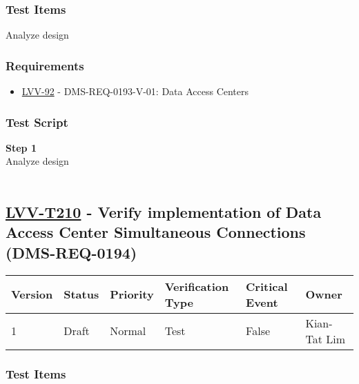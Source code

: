 \hypertarget{test-items-185}{%
\subsubsection{Test Items}\label{test-items-185}}

Analyze design

\hypertarget{requirements-186}{%
\subsubsection{Requirements}\label{requirements-186}}

\begin{itemize}
\tightlist
\item
  \href{https://jira.lsstcorp.org/browse/LVV-92}{LVV-92} -
  DMS-REQ-0193-V-01: Data Access Centers
\end{itemize}

\hypertarget{test-script-186}{%
\subsubsection{Test Script}\label{test-script-186}}

\textbf{Step 1}\\
Analyze design\\
~\\

\hypertarget{lvv-t210---verify-implementation-of-data-access-center-simultaneous-connections-dms-req-0194}{%
\subsection{\texorpdfstring{\href{https://jira.lsstcorp.org/secure/Tests.jspa\#/testCase/LVV-T210}{LVV-T210}
- Verify implementation of Data Access Center Simultaneous Connections
(DMS-REQ-0194)}{LVV-T210 - Verify implementation of Data Access Center Simultaneous Connections (DMS-REQ-0194)}}\label{lvv-t210---verify-implementation-of-data-access-center-simultaneous-connections-dms-req-0194}}

\begin{longtable}[]{@{}llllll@{}}
\toprule
Version & Status & Priority & Verification Type & Critical Event &
Owner\tabularnewline
\midrule
\endhead
1 & Draft & Normal & Test & False & Kian-Tat Lim\tabularnewline
\bottomrule
\end{longtable}

\hypertarget{test-items-186}{%
\subsubsection{Test Items}\label{test-items-186}}

